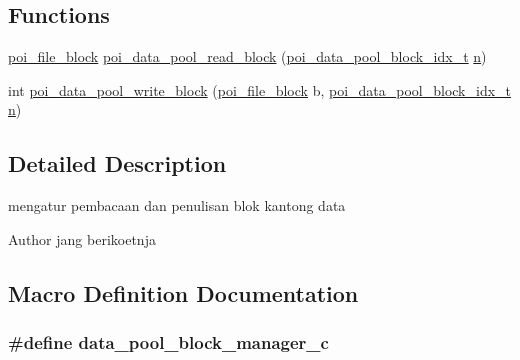 \subsection*{Functions}
\begin{DoxyCompactItemize}
\item 
\hyperlink{structpoi__file__block}{poi\-\_\-file\-\_\-block} \hyperlink{data-pool-block-manager_8c_ac930ae4a4b3ca65a49d45c7654f15149}{poi\-\_\-data\-\_\-pool\-\_\-read\-\_\-block} (\hyperlink{data-pool-block-manager_8h_a87e19ab8290bcd76be1c7db1e90cc6f6}{poi\-\_\-data\-\_\-pool\-\_\-block\-\_\-idx\-\_\-t} \hyperlink{allocation-table-test_8c_a24010dade8ebab3f87a48022772cd975}{n})
\item 
int \hyperlink{data-pool-block-manager_8c_a10624f1cbc61dd0a8a03aa94d8502567}{poi\-\_\-data\-\_\-pool\-\_\-write\-\_\-block} (\hyperlink{structpoi__file__block}{poi\-\_\-file\-\_\-block} b, \hyperlink{data-pool-block-manager_8h_a87e19ab8290bcd76be1c7db1e90cc6f6}{poi\-\_\-data\-\_\-pool\-\_\-block\-\_\-idx\-\_\-t} \hyperlink{allocation-table-test_8c_a24010dade8ebab3f87a48022772cd975}{n})
\end{DoxyCompactItemize}


\subsection{Detailed Description}
mengatur pembacaan dan penulisan blok kantong data \begin{DoxyAuthor}{Author}
jang berikoetnja 
\end{DoxyAuthor}


\subsection{Macro Definition Documentation}
\hypertarget{data-pool-block-manager_8c_acc334690346a1892e11c892ed27f70e7}{
\subsubsection[{data\-\_\-pool\-\_\-block\-\_\-manager\-\_\-c}]{\setlength{\rightskip}{0pt plus 5cm}\#define data\-\_\-pool\-\_\-block\-\_\-manager\-\_\-c}}\label{data-pool-block-manager_8c_acc334690346a1892e11c892ed27f70e7}


